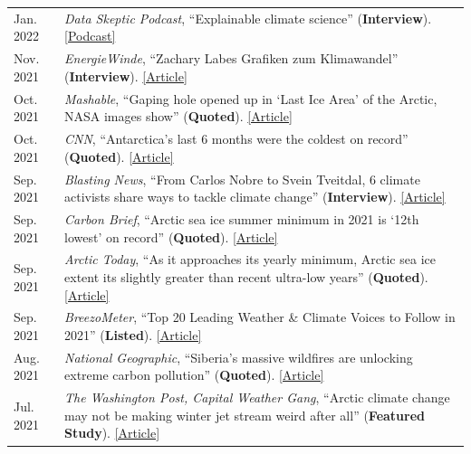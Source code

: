 \documentclass[margin,line,palatino,courier,10pt]{res}
\begin{document}
\begin{resume}
\begin{tabular}{@{}p{0.9in}p{4in}}
Jan. 2022 & \textit{Data Skeptic Podcast}, ``Explainable climate science'' (\textbf{Interview}). \href{https://dataskeptic.com/blog/episodes/2022/explainable-climate-science}{[Podcast]}\\
Nov. 2021 & \textit{EnergieWinde}, ``Zachary Labes Grafiken zum Klimawandel'' (\textbf{Interview}). \href{https://energiewinde.orsted.de/klimawandel-umwelt/zachary-labe-grafiken-arktis-klimawandel-interview-wissenschaftskommunikation}{[Article]}\\
Oct. 2021 & \textit{Mashable}, ``Gaping hole opened up in `Last Ice Area' of the Arctic, NASA images show'' (\textbf{Quoted}). \href{https://mashable.com/article/arctic-climate-change}{[Article]}\\
Oct. 2021 & \textit{CNN}, ``Antarctica's last 6 months were the coldest on record'' (\textbf{Quoted}). \href{https://www.cnn.com/2021/10/09/weather/weather-record-cold-antarctica-climate-change/index.html}{[Article]}\\
Sep. 2021 & \textit{Blasting News}, ``From Carlos Nobre to Svein Tveitdal, 6 climate activists share ways to tackle climate change'' (\textbf{Interview}). \href{https://us.blastingnews.com/world/2021/01/from-carlos-nobre-to-svein-tveitdal-4-climate-activists-share-ways-to-tackle-climate-change-003258138.html}{[Article]}\\
Sep. 2021 & \textit{Carbon Brief}, ``Arctic sea ice summer minimum in 2021 is `12th lowest' on record'' (\textbf{Quoted}). \href{https://www.carbonbrief.org/arctic-sea-ice-summer-minimum-in-2021-is-12th-lowest-on-record}{[Article]}\\
Sep. 2021 & \textit{Arctic Today}, ``As it approaches its yearly minimum, Arctic sea ice extent its slightly greater than recent ultra-low years'' (\textbf{Quoted}). \href{https://www.arctictoday.com/as-it-approaches-its-yearly-minimum-arctic-sea-ice-extent-its-slightly-greater-than-recent-ultra-low-years/}{[Article]}\\
Sep. 2021 & \textit{BreezoMeter}, ``Top 20 Leading Weather \& Climate Voices to Follow in 2021'' (\textbf{Listed}). \href{https://blog.breezometer.com/leading-weather-climate-voices-to-follow}{[Article]}\\
Aug. 2021 & \textit{National Geographic}, ``Siberia’s massive wildfires are unlocking extreme carbon pollution'' (\textbf{Quoted}). \href{https://www.nationalgeographic.com/environment/article/siberias-massive-wildfires-are-unlocking-extreme-carbon-pollution}{[Article]}\\
Jul. 2021 & \textit{The Washington Post, Capital Weather Gang}, ``Arctic climate change may not be making winter jet stream weird after all'' (\textbf{Featured Study}). \href{https://www.washingtonpost.com/weather/2021/07/31/arctic-climate-change-jetstream-winter/}{[Article]}\\

\end{tabular}
\end{resume}
\end{document}

